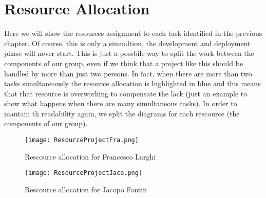 \chapter{Resource Allocation}

Here we will show the resources assignment to each task identified in the previous chapter.
Of course, this is only a simualtion, the development and deployment phase will never start.
This is just a possbile way to split the work between the components of our group, even if we think that a project like this should be handled by more than just two persons. In fact, when there are more than two tasks simultaneously the resource allocation is highlighted in blue and this means that that resource is overworking to compensate the lack (just an example to show what happens when there are many simultaneous tasks).
In order to mantain th readability again, we split the diagrams for each rescource (the components of our group).

\clearpage

\vspace{32pt}

\begin{figure}[htbp]
\centering
\texttt{[image: ResourceProjectFra.png]}
\caption{Rescource allocation for Francesco Larghi}
\end{figure}

\clearpage

\vspace{32pt}

\begin{figure}[htbp]
\centering
\texttt{[image: ResourceProjectJaco.png]}
\caption{Rescource allocation for Jacopo Fantin}
\end{figure}